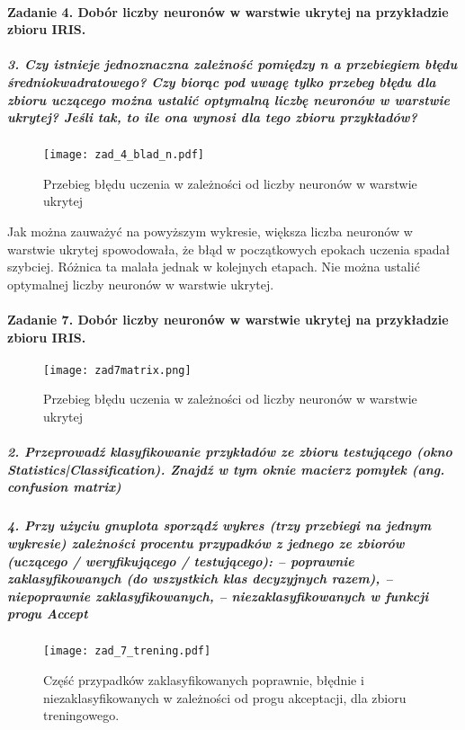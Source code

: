 \documentclass{article}
\begin{document}
\paragraph{Zadanie 4. Dobór liczby neuronów w warstwie ukrytej na przykładzie zbioru IRIS.}
\subparagraph{3. Czy istnieje jednoznaczna zależność pomiędzy n a przebiegiem błędu średniokwadratowego? Czy biorąc pod uwagę tylko przebeg błędu dla zbioru uczącego można ustalić optymalną liczbę neuronów w warstwie ukrytej? Jeśli tak, to ile ona wynosi dla tego zbioru przykładów?}

\begin{figure}[H]
\begin{center}
\texttt{[image: zad\_4\_blad\_n.pdf]}
\end{center}
\caption{Przebieg błędu uczenia w zależności od liczby neuronów w warstwie ukrytej}
\label{fig-1Tdelta}
\end{figure}

Jak można zauważyć na powyższym wykresie, większa liczba neuronów w warstwie ukrytej spowodowała, że błąd w początkowych epokach uczenia spadał szybciej. Różnica ta malała jednak w kolejnych etapach. Nie można ustalić optymalnej liczby neuronów w warstwie ukrytej. 

\paragraph{Zadanie 7. Dobór liczby neuronów w warstwie ukrytej na przykładzie zbioru IRIS.}
\begin{figure}[H]
\begin{center}
\texttt{[image: zad7matrix.png]}
\end{center}
\caption{Przebieg błędu uczenia w zależności od liczby neuronów w warstwie ukrytej}
\label{fig-1Tdelta}
\end{figure}

\subparagraph{2. Przeprowadź klasyfikowanie przykładów ze zbioru testującego (okno Statistics|Classification). Znajdź w tym oknie macierz pomyłek (ang. confusion matrix)}

\subparagraph{4. Przy użyciu gnuplota sporządź wykres (trzy przebiegi na jednym wykresie) zależności procentu przypadków z jednego ze zbiorów (uczącego / weryfikującego / testującego):
– poprawnie zaklasyfikowanych (do wszystkich klas decyzyjnych razem),
– niepoprawnie zaklasyfikowanych,
– niezaklasyfikowanych
w funkcji progu Accept}

\begin{figure}[H]
\begin{center}
\texttt{[image: zad\_7\_trening.pdf]}
\end{center}
\caption{Część przypadków zaklasyfikowanych poprawnie, błędnie i niezaklasyfikowanych w zależności od progu akceptacji, dla zbioru treningowego. }
\label{fig-1Tdelta}
\end{figure}
\end{document}
